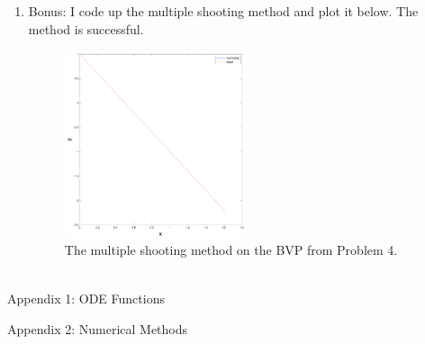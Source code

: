 \documentclass[11pt]{article}
\begin{document}
\begin{enumerate}
\clearpage
\pagebreak
\item Bonus: I code up the multiple shooting method and plot it below.
The method is successful.



\begin{figure}[h!]
  \centering
    \includegraphics[width=0.5\textwidth]{andy_hw07_prb07_01.pdf}
  \caption{The multiple shooting method on the BVP from Problem 4.}
\end{figure}

\begin{align*} \end{align*}

\end{enumerate}



\clearpage
\pagebreak
{\huge Appendix 1: ODE Functions}













\clearpage
\pagebreak
{\huge Appendix 2: Numerical Methods}



\end{document}
